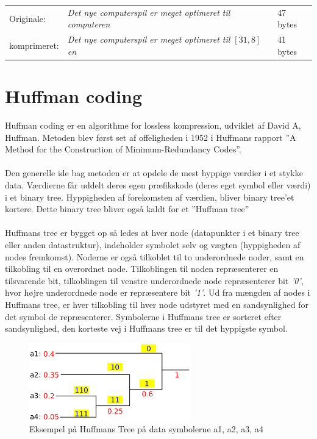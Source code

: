 \documentclass[12pt]{article}
\begin{document}
\begin{tabular}{lll}
  Originale: & \textit{Det nye computerspil er meget optimeret til computeren} & 47 bytes \\
  komprimeret: & \textit{Det nye computerspil er meget optimeret til $[31,8]$en} & 41 bytes
\end{tabular}
\newpage
\section{Huffman coding}
Huffman coding er en algorithme for lossless kompression, udviklet af David A, Huffman. Metoden blev først set af offeligheden i 1952 i Huffmans rapport 
”A Method for the Construction of Minimum-Redundancy Codes”.\cite*{Wiki/Huffman} \\\\
Den generelle ide bag metoden er at opdele de mest hyppige værdier i et stykke data. Værdierne får uddelt deres egen præfikskode (deres eget symbol eller værdi) i et binary tree.
Hyppigheden af forekomsten af værdien, bliver binary tree’et kortere. Dette binary tree bliver også kaldt for et ”Huffman tree”\cite{yt/Huffman} \\\\
Huffmans tree er bygget op så ledes at hver node (datapunkter i et binary tree eller anden datastruktur), indeholder symbolet selv og vægten (hyppigheden af nodes fremkomst). 
Noderne er også tilkoblet til to underordnede noder, samt en tilkobling til en overordnet node. Tilkoblingen til noden repræsenterer en tilsvarende bit, 
tilkoblingen til venstre underordnede node repræsenterer bit \textit{’0’}, hvor højre underordnede node er repræsentere bit \textit{’1’}. Ud fra mængden af nodes i Huffmans tree, er hver tilkobling til hver node udstyret med en 
sandsynlighed for det symbol de repræsenterer. Symbolerne i Huffmans tree er sorteret efter sandsynlighed, den korteste vej i Huffmans tree er til det hyppigste symbol.\\
\begin{figure}[ht]%
  \centering
  \includegraphics[width=7cm]{Huffman_coding_example.png}%
  \caption{\centering Eksempel på Huffmans Tree på data symbolerne a1, a2, a3, a4 \cite{Wiki/Huffman}}\label{Huffmans}%
\end{figure}\\
\end{document}
